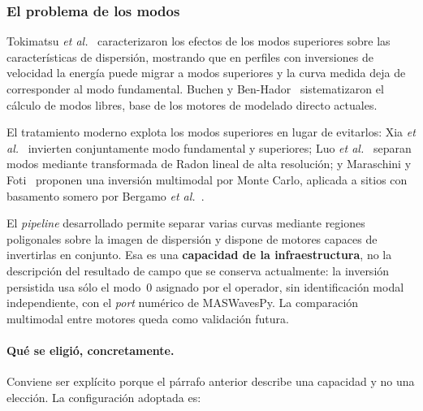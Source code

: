 \subsubsection{El problema de los modos}

Tokimatsu \emph{et al.}~\cite{Tokimatsu1992} caracterizaron los efectos de los modos
superiores sobre las caracter\'isticas de dispersi\'on, mostrando que en perfiles con
inversiones de velocidad la energ\'ia puede migrar a modos superiores y la curva medida
deja de corresponder al modo fundamental. Buchen y Ben-Hador~\cite{Buchen1996}
sistematizaron el c\'alculo de modos libres, base de los motores de modelado directo
actuales.

El tratamiento moderno explota los modos superiores en lugar de evitarlos:
Xia \emph{et al.}~\cite{Xia2003} invierten conjuntamente modo fundamental y superiores;
Luo \emph{et al.}~\cite{Luo2009} separan modos mediante transformada de Radon lineal de
alta resoluci\'on; y Maraschini y Foti~\cite{Maraschini2010} proponen una inversi\'on
multimodal por Monte Carlo, aplicada a sitios con basamento somero por Bergamo
\emph{et al.}~\cite{Bergamo2011}.

El \emph{pipeline} desarrollado permite separar varias curvas mediante regiones poligonales
sobre la imagen de dispersi\'on y dispone de motores capaces de invertirlas en conjunto.
Esa es una \textbf{capacidad de la infraestructura}, no la descripci\'on del resultado de
campo que se conserva actualmente: la inversi\'on persistida usa s\'olo el modo~0 asignado
por el operador, sin identificaci\'on modal independiente,
con el \emph{port} num\'erico de MASWavesPy. La comparaci\'on multimodal entre motores queda
como validaci\'on futura.

\paragraph{Qu\'e se eligi\'o, concretamente.} Conviene ser expl\'icito porque el p\'arrafo
anterior describe una capacidad y no una elecci\'on. La configuraci\'on adoptada es:

